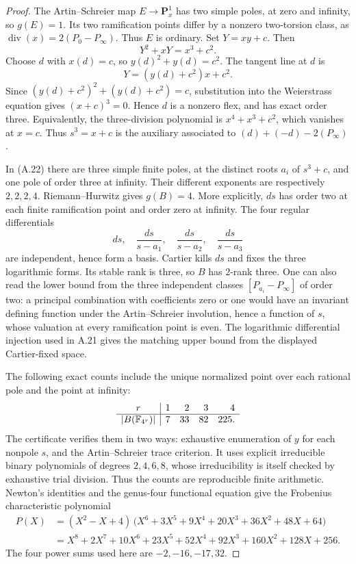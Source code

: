 \begin{proof}
The Artin--Schreier map $E\to\mathbf P^1_x$ has two simple
poles, at zero and infinity, so $g(E)=1$. Its two ramification
points differ by a nonzero two-torsion class, as
$\operatorname{div}(x)=2(P_0-P_\infty)$. Thus $E$ is ordinary.
Set $Y=xy+c$. Then
\[
 Y^2+xY=x^3+c^2.
\]
Choose $d$ with $x(d)=c$, so $y(d)^2+y(d)=c^2$.
The tangent line at $d$ is
\[
 Y=(y(d)+c^2)x+c^2.
\]
Since $(y(d)+c^2)^2+(y(d)+c^2)=c$, substitution into the
Weierstrass equation gives $(x+c)^3=0$. Hence $d$ is a
nonzero flex, and has exact order three. Equivalently, the
three-division polynomial is $x^4+x^3+c^2$, which vanishes
at $x=c$. Thus $s^3=x+c$ is the auxiliary associated to
$(d)+(-d)-2(P_\infty)$.

In (A.22) there are three simple finite poles, at the distinct
roots $a_i$ of $s^3+c$, and one pole of order three at
infinity. Their different exponents are respectively
$2,2,2,4$. Riemann--Hurwitz gives $g(B)=4$. More explicitly,
$ds$ has order two at each finite ramification point and
order zero at infinity. The four regular differentials
\[
 ds,\quad \frac{ds}{s-a_1},\quad
 \frac{ds}{s-a_2},\quad\frac{ds}{s-a_3}
\]
are independent, hence form a basis. Cartier kills $ds$ and
fixes the three logarithmic forms. Its stable rank is three,
so $B$ has $2$-rank three. One can also read the lower bound
from the three independent classes $[P_{a_i}-P_\infty]$ of
order two: a principal combination with coefficients zero
or one would have an invariant defining function under the
Artin--Schreier involution, hence a function of $s$, whose
valuation at every ramification point is even. The logarithmic
differential injection used in A.21 gives the matching upper
bound from the displayed Cartier-fixed space.

The following exact counts include the unique normalized point
over each rational pole and the point at infinity:
\[
\begin{array}{c|rrrr}
 r&1&2&3&4\\ \hline
 |B(\mathbb F_{4^r})|&7&33&82&225.
\end{array}
\]
The certificate
 verifies
them in two ways: exhaustive enumeration of $y$ for each
nonpole $s$, and the Artin--Schreier trace criterion. It uses
explicit irreducible binary polynomials of degrees $2,4,6,8$,
whose irreducibility is itself checked by exhaustive trial
division. Thus the counts are reproducible finite arithmetic.
Newton's identities and the genus-four functional equation
give the Frobenius characteristic polynomial
\citep[II, Theorem 1.1]{A_Milne2008}
\[
\begin{split}
 P(X)&=(X^2-X+4)\,
 \bigl(X^6+3X^5+9X^4+20X^3+36X^2+48X+64\bigr)\\
 &=X^8+2X^7+10X^6+23X^5+52X^4+92X^3
                          +160X^2+128X+256.
\end{split}
\tag{A.23}
\]
The four power sums used here are $-2,-16,-17,32$.


\end{proof}

